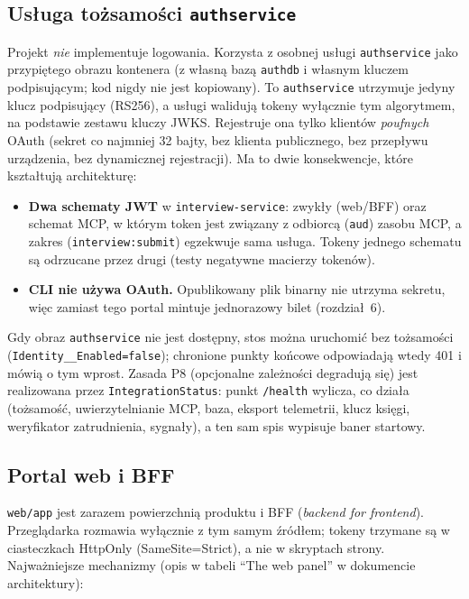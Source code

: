 \subsection{Usługa tożsamości \texttt{authservice}}

Projekt \emph{nie} implementuje logowania. Korzysta z osobnej usługi
\texttt{authservice} jako przypiętego obrazu kontenera (z własną bazą
\texttt{authdb} i własnym kluczem podpisującym; kod nigdy nie jest kopiowany).
To \texttt{authservice} utrzymuje jedyny klucz podpisujący (RS256), a usługi
walidują tokeny wyłącznie tym algorytmem, na podstawie zestawu kluczy JWKS.
Rejestruje ona tylko klientów \emph{poufnych} OAuth (sekret co najmniej
32 bajty, bez klienta publicznego, bez przepływu urządzenia, bez dynamicznej
rejestracji). Ma to dwie konsekwencje, które kształtują architekturę:

\begin{itemize}[itemsep=2pt]
  \item \textbf{Dwa schematy JWT} w \texttt{interview-service}: zwykły
        (web/BFF) oraz schemat MCP, w którym token jest związany z odbiorcą
        (\texttt{aud}) zasobu MCP, a zakres (\texttt{interview:submit})
        egzekwuje sama usługa. Tokeny jednego schematu są odrzucane przez drugi
        (testy negatywne macierzy tokenów).
  \item \textbf{CLI nie używa OAuth.} Opublikowany plik binarny nie utrzyma
        sekretu, więc zamiast tego portal mintuje jednorazowy bilet (rozdział~6).
\end{itemize}

Gdy obraz \texttt{authservice} nie jest dostępny, stos można uruchomić bez
tożsamości (\texttt{Identity\_\_}\allowbreak\texttt{Enabled=false}); chronione punkty końcowe
odpowiadają wtedy 401 i mówią o tym wprost. Zasada P8 (opcjonalne zależności
degradują się) jest realizowana przez \texttt{IntegrationStatus}: punkt
\texttt{/health} wylicza, co działa (tożsamość, uwierzytelnianie MCP, baza,
eksport telemetrii, klucz księgi, weryfikator zatrudnienia, sygnały), a ten sam
spis wypisuje baner startowy.

\subsection{Portal web i BFF}

\texttt{web/app} jest zarazem powierzchnią produktu i BFF (\emph{backend for
frontend}). Przeglądarka rozmawia wyłącznie z tym samym źródłem; tokeny
trzymane są w ciasteczkach HttpOnly (SameSite=Strict), a nie w skryptach strony.
Najważniejsze mechanizmy (opis w tabeli ``The web panel'' w dokumencie
architektury):

